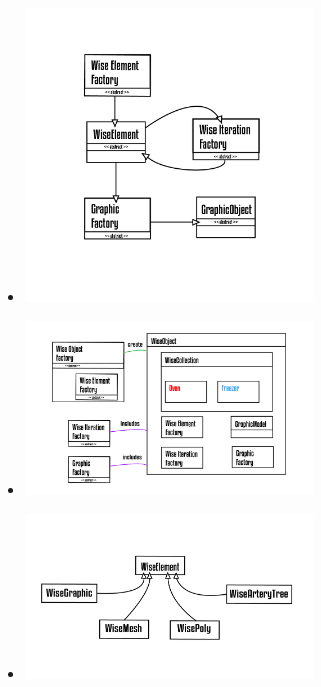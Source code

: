 \documentclass[10pt]{beamer}
\theoremstyle{remark}
\theoremstyle{definition}
\begin{document}
\begin{frame}[allowframebreaks]
		\framebreak
		\begin{itemize}
			
			\item \includegraphics[width=0.6\textwidth]{images/Prancheta 11@4x.png}
			
		\end{itemize}
		
		\framebreak
		\begin{itemize}
			
			\item \includegraphics[width=0.6\textwidth]{images/Prancheta 13_1@4x.png}
			
		\end{itemize}
		
		\framebreak
		\begin{itemize}
			
			\item \includegraphics[width=0.6\textwidth]{images/Prancheta 13@4x.png}
			

\end{itemize}
\end{frame}
\end{document}
